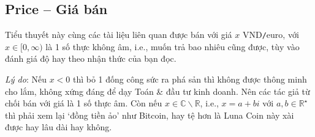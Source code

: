 \documentclass[12pt]{article}
\begin{document}
\subsection{Price -- Giá bán}
Tiểu thuyết này cùng các tài liệu liên quan được bán với giá $x$ VND{\tt/}euro, với $x\in[0,\infty)$ là 1 số thực không âm, i.e., muốn trả bao nhiêu cũng được, tùy vào đánh giá độ hay theo nhận thức của bạn đọc.

{\it Lý do}: Nếu $x < 0$ thì bỏ 1 đống công sức ra phá sản thì không được thông minh cho lắm, không xứng đáng để dạy Toán \& đầu tư kinh doanh. Nên các tác giả từ chối bán với giá là 1 số thực âm. Còn nếu $x\in\mathbb{C}\backslash\mathbb{R}$, i.e., $x = a + bi$ với $a,b\in\mathbb{R}^\star$ thì phải xem lại `đồng tiền ảo' như Bitcoin, hay tệ hơn là Luna Coin này xài được hay lâu dài hay không.


\printbibliography[heading=bibintoc]
	
\end{document}

